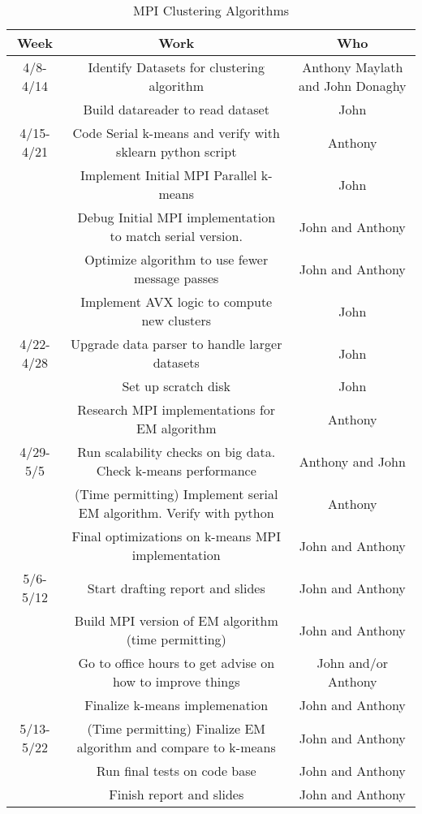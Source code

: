 \documentclass{article}
\begin{document}
\begin{table}[h!]
\centering
\begin{adjustbox}{width=\textwidth}
\begin{tabular}{ |c|c|c| }
\hline
Week&	Work&	Who\\
\hline
4/8-4/14 & Identify Datasets for clustering algorithm & Anthony Maylath and John Donaghy\\
 & Build datareader to read dataset & John\\
\hline
4/15-4/21 & Code Serial k-means and verify with sklearn python script& Anthony\\
 & Implement Initial MPI Parallel k-means & John\\
 & Debug Initial MPI implementation to match serial version.  & John and Anthony\\
 & Optimize algorithm to use fewer message passes & John and Anthony\\
 & Implement AVX logic to compute new clusters & John\\
 \hline 
 4/22-4/28 & Upgrade data parser to handle larger datasets & John\\
 & Set up scratch disk & John\\
 & Research MPI implementations for EM algorithm & Anthony\\
 \hline
 4/29-5/5 & Run scalability checks on big data. Check k-means performance & Anthony and John\\
 & (Time permitting) Implement serial EM algorithm. Verify with python & Anthony\\
 & Final optimizations on k-means MPI implementation & John and Anthony\\
 \hline
 5/6-5/12 & Start drafting report and slides & John and Anthony\\
 & Build MPI version of EM algorithm (time permitting) & John and Anthony\\
 & Go to office hours to get advise on how to improve things & John and/or Anthony\\
 & Finalize k-means implemenation & John and Anthony\\
 \hline
 5/13-5/22 & (Time permitting) Finalize EM algorithm and compare to k-means & John and Anthony\\
 & Run final tests on code base & John and Anthony\\
 & Finish report and slides & John and Anthony\\
 \hline
\end{tabular}
\end{adjustbox}
 \caption{MPI Clustering Algorithms}
 \label{mpi2}
 \end{table}
\end{document}
